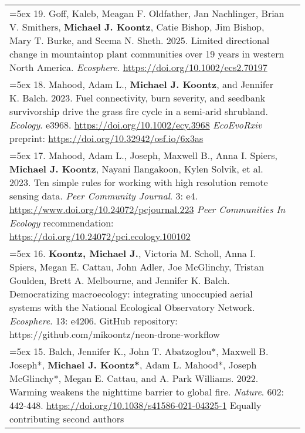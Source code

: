 \begin{longtable}{@{}>{\raggedright}p{6.10in} >{\raggedleft}X @{}}

\hangindent=5ex 19. Goff, Kaleb, Meagan F. Oldfather, Jan Nachlinger, Brian V. Smithers, \textbf{Michael J. Koontz}, Catie Bishop, Jim Bishop, Mary T. Burke, and Seema N. Sheth. 2025. Limited directional change in mountaintop plant communities over 19 years in western North America. \emph{Ecosphere}. \href{https://doi.org/10.1002/ecs2.70197}{https://doi.org/10.1002/ecs2.70197} & \tabularnewline

\hangindent=5ex 18. Mahood, Adam L., \textbf{Michael J. Koontz}, and Jennifer K. Balch. 2023. Fuel connectivity, burn severity, and seedbank survivorship drive the grass fire cycle in a semi-arid shrubland. \emph{Ecology}. e3968. \href{https://doi.org/10.1002/ecy.3968}{https://doi.org/10.1002/ecy.3968}
\newline \emph{EcoEvoRxiv} preprint: \href{https://doi.org/10.32942/osf.io/6x3as}{https://doi.org/10.32942/osf.io/6x3as} & \tabularnewline

\hangindent=5ex 17. Mahood, Adam L., Joseph, Maxwell B., Anna I. Spiers, \textbf{Michael J. Koontz}, Nayani Ilangakoon, Kylen Solvik, et al. 2023. Ten simple rules for working with high resolution remote sensing data. \emph{Peer Community Journal}. 3: e4. \href{https://www.doi.org/10.24072/pcjournal.223}{https://www.doi.org/10.24072/pcjournal.223}
\newline \emph{Peer Communities In Ecology} recommendation: \href{https://doi.org/10.24072/pci.ecology.100102}{https://doi.org/10.24072/pci.ecology.100102} & \tabularnewline

\hangindent=5ex 16. \textbf{Koontz, Michael J.}, Victoria M. Scholl, Anna I. Spiers, Megan E. Cattau, John Adler, Joe McGlinchy, Tristan Goulden, Brett A. Melbourne, and Jennifer K. Balch. Democratizing macroecology: integrating unoccupied aerial systems with the National Ecological Observatory Network. \emph{Ecosphere}. 13: e4206.
\newline GitHub repository: https://github.com/mikoontz/neon-drone-workflow & \tabularnewline

\hangindent=5ex 15. Balch, Jennifer K., John T. Abatzoglou*, Maxwell B. Joseph*, \textbf{Michael J. Koontz*}, Adam L. Mahood*, Joseph McGlinchy*, Megan E. Cattau, and A. Park Williams. 2022. Warming weakens the nighttime barrier to global fire. \emph{Nature}. 602: 442-448. \href{https://doi.org/10.1038/s41586-021-04325-1}{https://doi.org/10.1038/s41586-021-04325-1}
\newline *Equally contributing second authors & \tabularnewline


\end{longtable}
